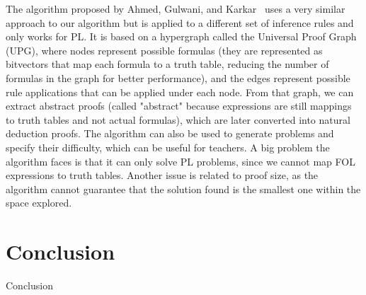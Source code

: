 \documentclass[runningheads]{llncs}
\begin{document}
The algorithm proposed by Ahmed, Gulwani, and Karkar~\cite{IJCAI13} uses a very similar approach to our algorithm but is applied to a different set of inference rules and only works for PL. It is based on a hypergraph called the Universal Proof Graph (UPG), where nodes represent possible formulas (they are represented as bitvectors that map each formula to a truth table, reducing the number of formulas in the graph for better performance), and the edges represent possible rule applications that can be applied under each node. From that graph, we can extract abstract proofs (called "abstract" because expressions are still mappings to truth tables and not actual formulas), which are later converted into natural deduction proofs. The algorithm can also be used to generate problems and specify their difficulty, which can be useful for teachers. A big problem the algorithm faces is that it can only solve PL problems, since we cannot map FOL expressions to truth tables. Another issue is related to proof size, as the algorithm cannot guarantee that the solution found is the smallest one within the space explored.

\section{Conclusion}
Conclusion


\end{document}
